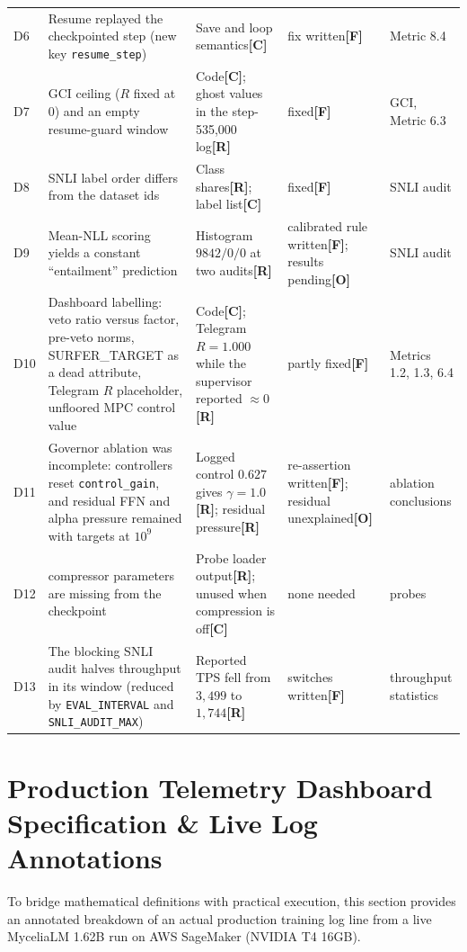 \documentclass[11pt,a4paper]{article}
\newcommand{\sR}{\textbf{[R]}}
\newcommand{\sC}{\textbf{[C]}}
\newcommand{\sF}{\textbf{[F]}}
\newcommand{\sO}{\textbf{[O]}}
\begin{document}
\begin{longtable}{>{\raggedright\arraybackslash}p{0.7cm} >{\raggedright\arraybackslash}p{5.3cm} >{\raggedright\arraybackslash}p{4.4cm} >{\raggedright\arraybackslash}p{2.0cm} >{\raggedright\arraybackslash}p{2.6cm}}
D6 & Resume replayed the checkpointed step (new key \texttt{resume\_step}) & Save and loop semantics\sC{} & fix written\sF{} & Metric 8.4\\
D7 & GCI ceiling ($R$ fixed at 0) and an empty resume-guard window & Code\sC{}; ghost values in the step-535{,}000 log\sR{} & fixed\sF{} & GCI, Metric 6.3\\
D8 & SNLI label order differs from the dataset ids & Class shares\sR{}; label list\sC{} & fixed\sF{} & SNLI audit\\
D9 & Mean-NLL scoring yields a constant ``entailment'' prediction & Histogram $9842/0/0$ at two audits\sR{} & calibrated rule written\sF{}; results pending\sO{} & SNLI audit\\
D10 & Dashboard labelling: veto ratio versus factor, pre-veto norms, SURFER\_TARGET as a dead attribute, Telegram $R$ placeholder, unfloored MPC control value & Code\sC{}; Telegram $R=1.000$ while the supervisor reported $\approx 0$\sR{} & partly fixed\sF{} & Metrics 1.2, 1.3, 6.4\\
D11 & Governor ablation was incomplete: controllers reset \texttt{control\_gain}, and residual FFN and alpha pressure remained with targets at $10^9$ & Logged control $0.627$ gives $\gamma = 1.0$\sR{}; residual pressure\sR{} & re-assertion written\sF{}; residual unexplained\sO{} & ablation conclusions\\
D12 & 24 compressor parameters are missing from the checkpoint & Probe loader output\sR{}; unused when compression is off\sC{} & none needed & probes\\
D13 & The blocking SNLI audit halves throughput in its window (reduced by \texttt{EVAL\_INTERVAL} and \texttt{SNLI\_AUDIT\_MAX}) & Reported TPS fell from $3{,}499$ to $1{,}744$\sR{} & switches written\sF{} & throughput statistics\\
\end{longtable}
\endgroup

\section{Production Telemetry Dashboard Specification \& Live Log Annotations}

To bridge mathematical definitions with practical execution, this section provides an annotated breakdown of an actual production training log line from a live MyceliaLM 1.62B run on AWS SageMaker (NVIDIA T4 16GB).
\end{document}
